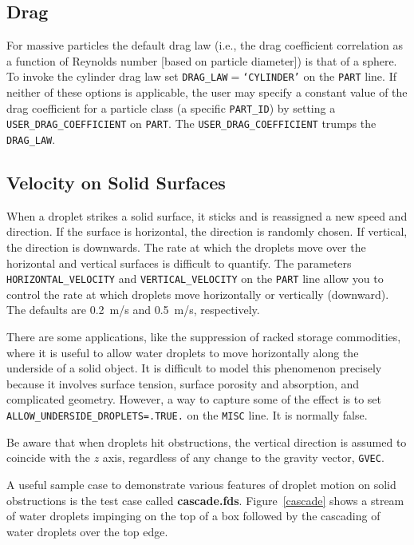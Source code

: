 \documentclass[11pt]{book}
\newcommand{\ct}{\tt\small}
\begin{document}
\subsection{Drag}
\label{info:particle_drag}

For massive particles the default drag law (i.e., the drag coefficient correlation as a function of Reynolds number [based on particle diameter]) is that of a sphere.
To invoke the cylinder drag law set {\ct DRAG\_LAW$=$`CYLINDER'} on the {\ct PART} line.  If neither of these options is applicable,
the user may specify a constant value of the drag coefficient for a particle class (a specific {\ct PART\_ID}) by setting a {\ct USER\_DRAG\_COEFFICIENT} on {\ct PART}.
The {\ct USER\_DRAG\_COEFFICIENT} trumps the {\ct DRAG\_LAW}.

\subsection{Velocity on Solid Surfaces}
\label{info:surface_droplets}

When a droplet strikes a solid surface, it sticks and is reassigned a new speed and direction. If the surface is
horizontal, the direction is randomly chosen. If vertical, the direction is downwards.
The rate at which the droplets move over the horizontal and vertical surfaces is difficult to
quantify. The parameters {\ct HORIZONTAL\_VELOCITY} and {\ct VERTICAL\_VELOCITY} on the {\ct PART} line
allow you to control the rate at which droplets move horizontally or vertically (downward). The defaults are
0.2~m/s and 0.5~m/s, respectively.

There are some applications, like the suppression of racked storage commodities, where it is useful to allow water droplets to move horizontally
along the underside of a solid object. It is difficult to model this phenomenon precisely because it involves surface tension, surface porosity and
absorption, and complicated geometry. However, a way to capture some of the effect is to set {\ct ALLOW\_UNDERSIDE\_DROPLETS=.TRUE.} on the
{\ct MISC} line. It is normally false.

\begin{warning}
Be aware that when droplets hit obstructions, the vertical direction is assumed to coincide with the $z$ axis, regardless of any change to the gravity vector, {\ct GVEC}.
\end{warning}

\noindent
A useful sample case to demonstrate various features of droplet motion on solid obstructions is the test case called {\bf cascade.fds}. Figure~\ref{cascade} shows a stream
of water droplets impinging on the top of a box followed by the cascading of water droplets over the top edge.
\end{document}
